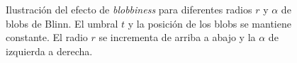 \begin{figure}[htp]
\begin{center}
  \end{center}
  \caption[Ilustración del efecto de \emph{blobbiness} para diferentes radios $r$ y $\alpha$ de blobs de Blinn]{Ilustración del efecto de \emph{blobbiness} para diferentes radios $r$ y $\alpha$ de blobs de Blinn. El umbral $t$ y la posición de los blobs se mantiene constante. El radio $r$ se incrementa de arriba a abajo y la $\alpha$ de izquierda a derecha.}
  \label{fig:metaballs}
\end{figure}

